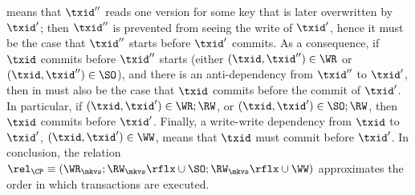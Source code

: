 means that $\txid''$ reads one version for some key that 
is later overwritten by $\txid'$; then $\txid''$ is prevented from seeing the write of $\txid'$, 
hence it {must} be the case that $\txid''$ starts before 
$\txid'$ commits. 
As a consequence, if $\txid$ commits before $\txid''$ starts 
(either $(\txid, \txid'') \in \WR$ or $(\txid,\txid'') \in \SO$), 
and there is an anti-dependency 
from $\txid''$ to $\txid'$, then in {must} also be the case that $\txid$ commits before 
the commit of $\txid'$. In particular, if $(\txid,\txid') \in \WR;\RW$, 
or $(\txid,\txid') \in \SO;\RW$, then $\txid$ commits before $\txid'$.
Finally, a write-write dependency from $\txid$ to $\txid'$, $(\txid,\txid') \in\WW$, means that $\txid$ {must} commit before $\txid'$. 
In conclusion, the relation $\rel_{\CP} \equiv (\WR_{\mkvs}; \RW_{\mkvs}\rflx \cup \SO;  \RW_{\mkvs}\rflx \cup \WW)$ 
approximates the order in which transactions are executed. 

